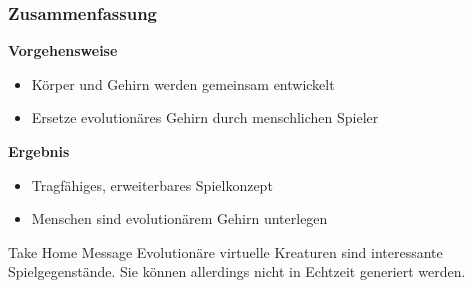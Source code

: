 \documentclass{beamer}
\begin{document}
\begin{frame}
	\frametitle{Zusammenfassung}
	\pause
	\textbf{Vorgehensweise}
	\begin{itemize}
		\item Körper und Gehirn werden gemeinsam entwickelt \pause
		\item Ersetze evolutionäres Gehirn durch menschlichen Spieler \pause
	\end{itemize}
	\vspace{1em}
	\textbf{Ergebnis}
	\begin{itemize}
		\item Tragfähiges, erweiterbares Spielkonzept \pause
		\item Menschen sind evolutionärem Gehirn unterlegen \pause
	\end{itemize}
	\vspace{1em}
	\begin{block}{Take Home Message}
		Evolutionäre virtuelle Kreaturen sind interessante Spielgegenstände. Sie können allerdings nicht in Echtzeit generiert werden.
	\end{block}
	
\end{frame}
\end{document}
